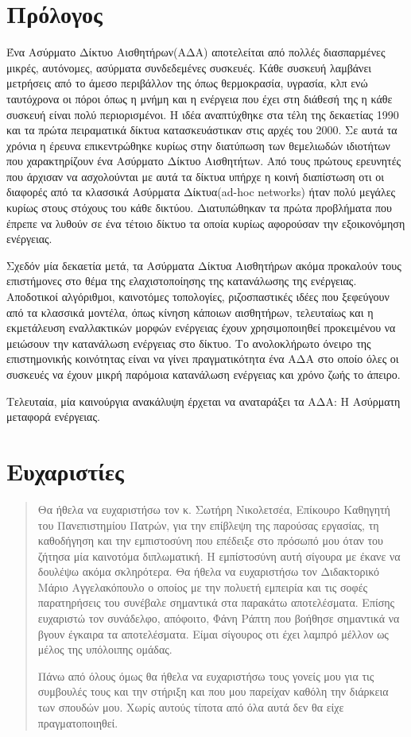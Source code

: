 \tableofcontents
\chapter{Πρόλογος}
Ένα Ασύρματο Δίκτυο Αισθητήρων(ΑΔΑ) αποτελείται από πολλές διασπαρμένες μικρές, αυτόνομες, ασύρματα συνδεδεμένες συσκευές. Κάθε συσκευή λαμβάνει μετρήσεις από το
άμεσο περιβάλλον της όπως θερμοκρασία, υγρασία, κλπ ενώ ταυτόχρονα οι πόροι όπως η μνήμη και η ενέργεια που έχει στη διάθεσή της η κάθε συσκευή είναι πολύ
περιορισμένοι.
Η ιδέα αναπτύχθηκε στα τέλη της δεκαετίας 1990 και τα πρώτα πειραματικά δίκτυα κατασκευάστικαν στις αρχές του 2000. Σε αυτά τα χρόνια η έρευνα επικεντρώθηκε κυρίως
στην διατύπωση των θεμελιωδών ιδιοτήτων που χαρακτηρίζουν ένα Ασύρματο Δίκτυο Αισθητήτων. Από τους πρώτους ερευνητές που άρχισαν να ασχολούνται με αυτά τα
δίκτυα υπήρχε η κοινή διαπίστωση οτι οι διαφορές από τα κλασσικά Ασύρματα Δίκτυα(ad-hoc networks) ήταν πολύ μεγάλες κυρίως στους στόχους του κάθε δικτύου.
Διατυπώθηκαν τα πρώτα προβλήματα που έπρεπε να λυθούν σε ένα τέτοιο δίκτυο τα οποία κυρίως αφορούσαν την εξοικονόμηση ενέργειας.

Σχεδόν μία δεκαετία μετά, τα Ασύρματα Δίκτυα Αισθητήρων ακόμα προκαλούν τους επιστήμονες στο θέμα της ελαχιστοποίησης της κατανάλωσης της ενέργειας. Αποδοτικοί
αλγόριθμοι, καινοτόμες τοπολογίες, ριζοσπαστικές ιδέες που ξεφεύγουν από τα κλασσικά μοντέλα, όπως κίνηση κάποιων αισθητήρων, τελευταίως και η εκμετάλευση
εναλλακτικών μορφών ενέργειας έχουν χρησιμοποιηθεί προκειμένου να μειώσουν την κατανάλωση ενέργειας στο δίκτυο. Το ανολοκλήρωτο όνειρο της επιστημονικής κοινότητας
είναι να γίνει πραγματικότητα ένα ΑΔΑ στο οποίο όλες οι συσκευές να έχουν μικρή παρόμοια κατανάλωση ενέργειας και χρόνο ζωής το άπειρο.

Τελευταία, μία καινούργια ανακάλυψη έρχεται να αναταράξει τα ΑΔΑ: Η Ασύρματη μεταφορά ενέργειας.

\chapter{Ευχαριστίες}
\begin{abstract}
Θα ήθελα να ευχαριστήσω τον κ. Σωτήρη Νικολετσέα, Επίκουρο Καθηγητή του Πανεπιστημίου Πατρών, για την επίβλεψη της παρούσας εργασίας, τη καθοδήγηση και την
εμπιστοσύνη που επέδειξε στο πρόσωπό μου όταν του ζήτησα μία καινοτόμα διπλωματική. Η εμπίστοσύνη αυτή σίγουρα με έκανε να δουλέψω ακόμα σκληρότερα. Θα ήθελα
να ευχαριστήσω τον Διδακτορικό Μάριο Αγγελακόπουλο ο οποίος με την πολυετή εμπειρία και τις σοφές παρατηρήσεις του συνέβαλε σημαντικά στα παρακάτω αποτελέσματα.
Επίσης ευχαριστώ τον συνάδελφο, απόφοιτο, Φάνη Ράπτη που βοήθησε σημαντικά να βγουν έγκαιρα τα αποτελέσματα. Είμαι σίγουρος οτι έχει λαμπρό μέλλον ως μέλος
της υπόλοιπης ομάδας.

Πάνω από όλους όμως θα ήθελα να ευχαριστήσω τους γονείς μου για τις συμβουλές τους και την στήριξη και που μου παρείχαν καθόλη την
διάρκεια των σπουδών μου. Χωρίς αυτούς τίποτα από όλα αυτά δεν θα είχε πραγματοποιηθεί.



\end{abstract}

